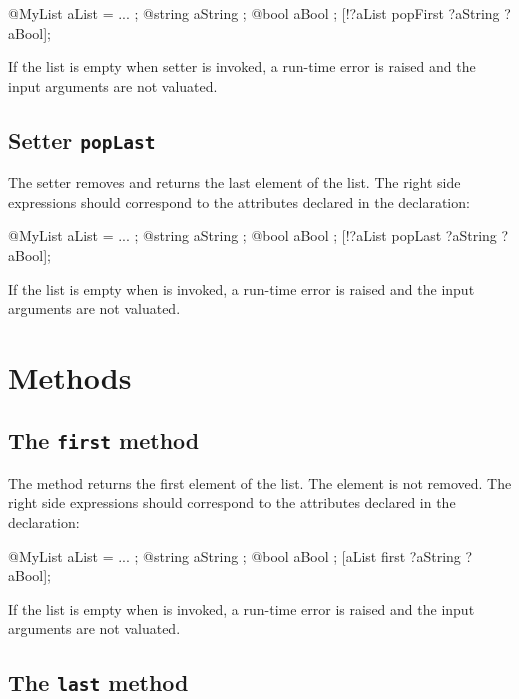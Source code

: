 \begin{galgascode}
@MyList aList = ... ;
@string aString ;
@bool aBool ;
[!?aList popFirst ?aString ?aBool];
\end{galgascode}

If the list is empty when  setter is invoked, a run-time error is raised and the input arguments are not valuated.

\subsection{Setter \texttt{popLast}}


The  setter removes and returns the last element of the list. The right side expressions should correspond to the attributes declared in the  declaration:

\begin{galgascode}
@MyList aList = ... ;
@string aString ;
@bool aBool ;
[!?aList popLast ?aString ?aBool];
\end{galgascode}

If the list is empty when  is invoked, a run-time error is raised and the input arguments are not valuated.

\section{Methods}

\subsection{The \texttt{first} method}

The  method returns the first element of the list. The element is not removed. The right side expressions should correspond to the attributes declared in the  declaration:

\begin{galgascode}
@MyList aList = ... ;
@string aString ;
@bool aBool ;
[aList first ?aString ?aBool];
\end{galgascode}

If the list is empty when  is invoked, a run-time error is raised and the input arguments are not valuated.

\subsection{The \texttt{last} method}

